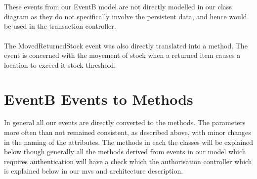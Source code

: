 \documentclass[a4paper]{article}
\begin{document}
\\\\
These events from our EventB model are not directly modelled in our class diagram as they do not specifically involve the persistent data, and hence would be used in the transaction controller. 
\\\\
The MovedReturnedStock event was also directly translated into a method. The event is concerned with the movement of stock when a returned item causes a location to exceed it stock threshold.
\pagebreak

\section{EventB Events to Methods}
In general all our events are directly converted to the methods. The parameters more often than not remained consistent, as described above, with minor changes in the naming of the attributes. The methods in each the classes will be explained below though generally all the methods derived from events in our model which requires authentication will have a check which the authorisation controller which is explained below in our mvs and architecture description.
\\\\
\end{document}
